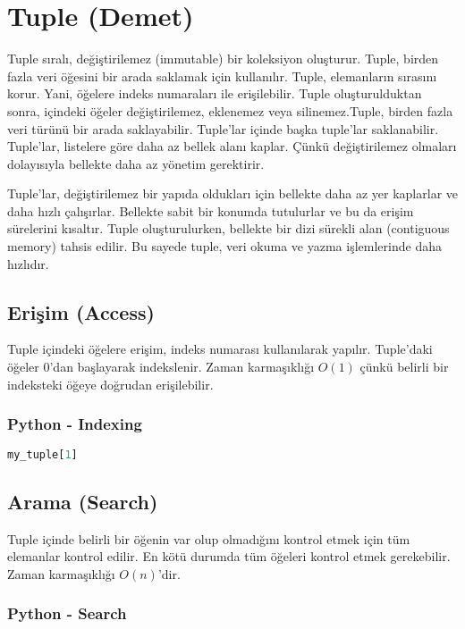 \section{Tuple (Demet)}

Tuple sıralı, değiştirilemez (immutable) bir koleksiyon oluşturur. Tuple, birden fazla veri öğesini bir arada saklamak için kullanılır. Tuple, elemanların sırasını korur. Yani, öğelere indeks numaraları ile erişilebilir. Tuple oluşturulduktan sonra, içindeki öğeler değiştirilemez, eklenemez veya silinemez.Tuple, birden fazla veri türünü bir arada saklayabilir. Tuple'lar içinde başka tuple'lar saklanabilir. Tuple'lar, listelere göre daha az bellek alanı kaplar. Çünkü değiştirilemez olmaları dolayısıyla bellekte daha az yönetim gerektirir.

Tuple'lar, değiştirilemez bir yapıda oldukları için bellekte daha az yer kaplarlar ve daha hızlı çalışırlar. Bellekte sabit bir konumda tutulurlar ve bu da erişim sürelerini kısaltır. Tuple oluşturulurken, bellekte bir dizi sürekli alan (contiguous memory) tahsis edilir. Bu sayede tuple, veri okuma ve yazma işlemlerinde daha hızlıdır.

\subsection{Erişim (Access)}

Tuple içindeki öğelere erişim, indeks numarası kullanılarak yapılır. Tuple'daki öğeler 0'dan başlayarak indekslenir. Zaman karmaşıklığı $O(1)$ çünkü belirli bir indeksteki öğeye doğrudan erişilebilir.

\subsubsection{Python - Indexing}

\begin{lstlisting}[language=Python]
my_tuple[1]
\end{lstlisting}

\subsection{Arama (Search)}

Tuple içinde belirli bir öğenin var olup olmadığını kontrol etmek için tüm elemanlar kontrol edilir. En kötü durumda tüm öğeleri kontrol etmek gerekebilir. Zaman karmaşıklığı $O(n)$'dir.

\subsubsection{Python - Search}


